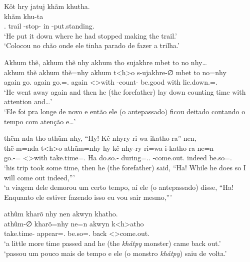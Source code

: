 \documentclass[output=paper,
modfonts,nonflat
]{langsci/langscibook}
\begin{document}
\ea  Kôt hry jatuj khãm khutha. \\[.3em]
  khãm khu-ta                    \\
     {} \Third.\Erg{} trail \E-stop-\Nmlz{} {} in   \Third-put.standing.\Sg{} \\
\glt `He put it down where he had stopped making the trail.' \\
     `Colocou no chão onde ele tinha parado de fazer a trilha.' \\
\z

\largerpage
\ea  Akhum thẽ, akhum thẽ nhy akhum tho sujakhre mbet to no nhy\ldots{} \\[.3em]
\gll akhum thẽ      akhum thẽ=nhy             akhum t<h>o        s-ujakhre-∅          mbet    to   no=nhy                    \\
     again go.\Sg{} again go.\Sg{}=\AAnd.\Ds{} again <\Third>with \Third-count-\Nmlz{} be.good with lie.down.\Sg{}=\AAnd.\Ds{} \\
\glt `He went away again and then he (the forefather) lay down counting time with attention and\ldots{}' \\
     `Ele foi pra longe de novo e então ele (o antepassado) ficou deitado contando o tempo com atenção e\ldots{}' \\
\z

\ea  thẽm nda tho athũm nhy, ``Hy! Kê nhyry ri wa ikatho ra'' nen, \\[.3em]
\gll thẽ-m=nda             t<h>o        athũm=nhy            hy kê     nhy-ry              ri=wa                    i-katho               ra     ne=n             \\
     go.\Sg-\Nmlz{}=\Nom{} <\Third>with take.time=\AAnd.\Ds{} Ha \Fut{} do.so.\Nmlz-\Nmlz{} during=\AAnd.\Ds.\First{} \First-come.out.\Sg{} indeed be.so=\AAnd.\Ss{} \\
\glt `his trip took some time, then he (the forefather) said, ``Ha! While he does so I will come out indeed,''{}' \\
     `a viagem dele demorou um certo tempo, aí ele (o antepassado) disse, ``Ha! Enquanto ele estiver fazendo isso eu vou sair mesmo,''{}' \\
\z

\ea  athũm kharõ nhy nen akwyn khatho. \\[.3em]
\gll athũm-∅           kharõ=nhy         ne=n             akwyn k<h>atho               \\
     take.time-\Nmlz{} appear=\AAnd.\Ds{} be.so=\AAnd.\Ss{} back  <\Third>come.out.\Sg{} \\
\glt `a little more time passed and he (the \textit{khátpy} monster) came back out.' \\
     `passou um pouco mais de tempo e ele (o monstro \textit{khátpy}) saiu de volta.' \\
\z
\end{document}
